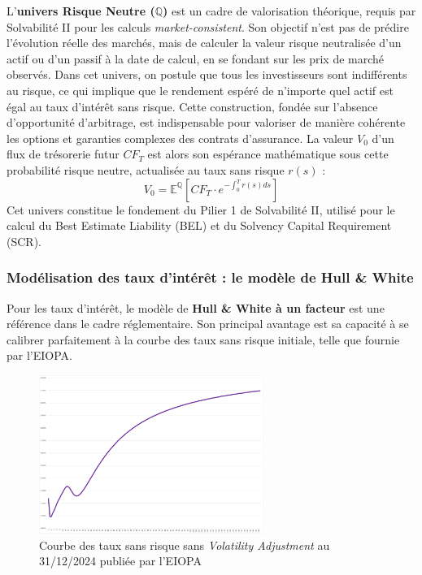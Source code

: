 L'\textbf{univers Risque Neutre ($\mathbb{Q}$)} est un cadre de valorisation théorique, requis par Solvabilité II pour les calculs \textit{market-consistent}. Son objectif n'est pas de prédire l'évolution réelle des marchés, mais de calculer la valeur risque neutralisée d'un actif ou d'un passif à la date de calcul, en se fondant sur les prix de marché observés. Dans cet univers, on postule que tous les investisseurs sont indifférents au risque, ce qui implique que le rendement espéré de n'importe quel actif est égal au taux d'intérêt sans risque. Cette construction, fondée sur l'absence d'opportunité d'arbitrage, est indispensable pour valoriser de manière cohérente les options et garanties complexes des contrats d'assurance. La valeur $V_0$ d'un flux de trésorerie futur $CF_T$ est alors son espérance mathématique sous cette probabilité risque neutre, actualisée au taux sans risque $r(s)$ :
\begin{equation}
    V_0 = \mathbb{E}^{\mathbb{Q}} \left[ CF_T \cdot e^{-\int_0^T r(s)ds} \right]
    \label{eq:valeur_risque_neutre}
\end{equation}
Cet univers constitue le fondement du Pilier 1 de Solvabilité II, utilisé pour le calcul du Best Estimate Liability (BEL) et du Solvency Capital Requirement (SCR).

\subsubsection{Modélisation des taux d'intérêt : le modèle de Hull \& White}
Pour les taux d'intérêt, le modèle de \textbf{Hull \& White à un facteur} est une référence dans le cadre réglementaire. Son principal avantage est sa capacité à se calibrer parfaitement à la courbe des taux sans risque initiale, telle que fournie par l'EIOPA.
\begin{figure}[H]
    \centering
    \includegraphics[width=0.65\textwidth]{images/2_chapitres/chapitre1/courbe_EIOPA.png}
    \caption{Courbe des taux sans risque sans \textit{Volatility Adjustment} au 31/12/2024 publiée par l'EIOPA}
    \label{fig:courbe_EIOPA}
\end{figure}

